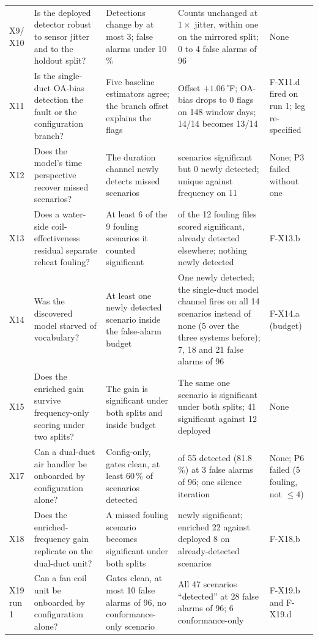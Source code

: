 \documentclass[11pt,letterpaper]{article}
\begin{document}
{\begin{longtable}{@{}>{\raggedright\arraybackslash}p{0.9cm}>{\raggedright\arraybackslash}p{4.3cm}>{\raggedright\arraybackslash}p{3.2cm}>{\raggedright\arraybackslash}p{4.2cm}>{\raggedright\arraybackslash}p{2.4cm}@{}}
X9/ X10 & Is the deployed detector robust to sensor jitter and to the holdout split? & Detections change by at most 3; false alarms under 10\,\% & Counts unchanged at $1\times$ jitter, within one on the mirrored split; 0 to 4 false alarms of 96 & None \\
X11 & Is the single-duct OA-bias detection the fault or the configuration branch? & Five baseline estimators agree; the branch offset explains the flags & Offset $+1.06\,^\circ$F; OA-bias drops to 0 flags on 148 window days; 14/14 becomes 13/14 & F-X11.d fired on run 1; leg re-specified \\
X12 & Does the model's time perspective recover missed scenarios? & The duration channel newly detects missed scenarios & 11 scenarios significant but 0 newly detected; unique against frequency on 11 & None; P3 failed without one \\
X13 & Does a water-side coil-effectiveness residual separate reheat fouling? & At least 6 of the 9 fouling scenarios it counted significant & 1 of the 12 fouling files scored significant, already detected elsewhere; nothing newly detected & F-X13.b \\
X14 & Was the discovered model starved of vocabulary? & At least one newly detected scenario inside the false-alarm budget & One newly detected; the single-duct model channel fires on all 14 scenarios instead of none (5 over the three systems before); 7, 18 and 21 false alarms of 96 & F-X14.a (budget) \\
X15 & Does the enriched gain survive frequency-only scoring under two splits? & The gain is significant under both splits and inside budget & The same one scenario is significant under both splits; 41 significant against 12 deployed & None \\
X17 & Can a dual-duct air handler be onboarded by configuration alone? & Config-only, gates clean, at least 60\,\% of scenarios detected & 45 of 55 detected (81.8\,\%) at 3 false alarms of 96; one silence iteration & None; P6 failed (5 fouling, not $\le 4$) \\
X18 & Does the enriched-frequency gain replicate on the dual-duct unit? & A missed fouling scenario becomes significant under both splits & 0 newly significant; enriched 22 against deployed 8 on already-detected scenarios & F-X18.b \\
X19 run 1 & Can a fan coil unit be onboarded by configuration alone? & Gates clean, at most 10 false alarms of 96, no conformance-only scenario & All 47 scenarios ``detected'' at 28 false alarms of 96; 6 conformance-only & F-X19.b and F-X19.d \\

\end{longtable}}
\end{document}
